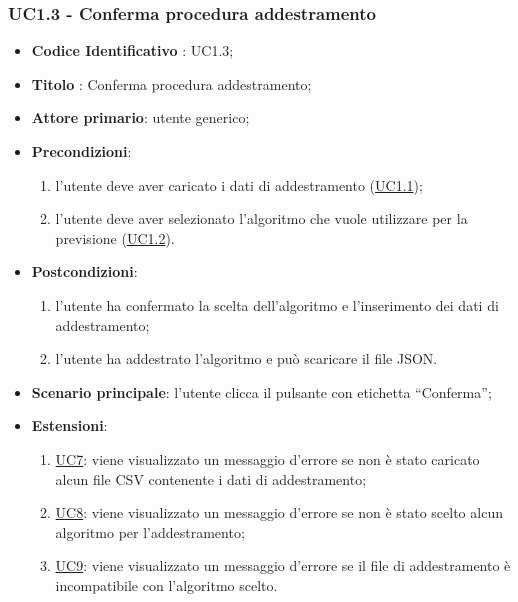 	\subsubsection{UC1.3 - Conferma procedura addestramento}
		\begin{itemize}
			\item\textbf{Codice Identificativo} : UC1.3;
			\item\textbf{Titolo} : Conferma procedura addestramento;
			\item\textbf{Attore primario}: utente generico;
			\item\textbf{Precondizioni}:
				\begin{enumerate}
					\item l'utente deve aver caricato i dati di addestramento (\hyperref[par:UC1.1]{UC1.1});
					\item l'utente deve aver selezionato l'algoritmo che vuole utilizzare per la previsione (\hyperref[par:UC1.2]{UC1.2}).
				\end{enumerate}
			\item\textbf{Postcondizioni}:
				\begin{enumerate}
					\item l'utente ha confermato la scelta dell'algoritmo e l'inserimento dei dati di addestramento;
					\item l'utente ha addestrato l'algoritmo e può scaricare il file JSON.
				\end{enumerate}
			\item\textbf{Scenario principale}: l'utente clicca il pulsante con etichetta “Conferma”;
			\item\textbf{Estensioni}:
			\begin{enumerate}
				\item \hyperref[par:UC7]{UC7}: viene visualizzato un messaggio d'errore se non è stato caricato alcun file CSV contenente i dati di addestramento;
				\item \hyperref[par:UC8]{UC8}: viene visualizzato un messaggio d'errore se non è stato scelto alcun algoritmo per l'addestramento;
				\item \hyperref[par:UC9]{UC9}: viene visualizzato un messaggio d'errore se il file di addestramento è incompatibile con l'algoritmo scelto.
			\end{enumerate}
			 
						
		\end{itemize}
		
	\label{par:UC1.4}
